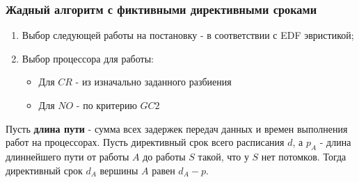 \begin{frame}
    \frametitle{Жадный алгоритм с фиктивными директивными сроками}
    \begin{enumerate}
        \item Выбор следующей работы на постановку - в соответствии с EDF эвристикой;
        \item Выбор процессора для работы:
        \begin{itemize}
            \item Для $CR$ - из изначально заданного разбиения
            \item Для $NO$ - по критерию $GC2$
        \end{itemize}
    \end{enumerate}
    Пусть \textbf{длина пути} - сумма всех задержек передач данных и времен выполнения работ на процессорах.
    Пусть директивный срок всего расписания $d$, а $p_A$ - длина длиннейшего пути от работы $A$ до работы $S$ такой, что у $S$ нет потомков. Тогда директивный срок $d_A$ вершины $A$ равен $d_A - p$.
\end{frame}

